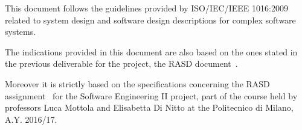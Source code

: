 This document follows the guidelines provided by ISO/IEC/IEEE 1016:2009~\cite{ieee-1016} related to system design and software design descriptions for complex software systems.

The indications provided in this document are also based on the ones stated in the previous deliverable for the project, the RASD document~\cite{rasd}.

Moreover it is strictly based on the specifications concerning the RASD assignment~\cite{se-assignments} for the Software Engineering II project, part of the course held by professors Luca Mottola and Elisabetta Di Nitto at the Politecnico di Milano, A.Y. 2016/17.